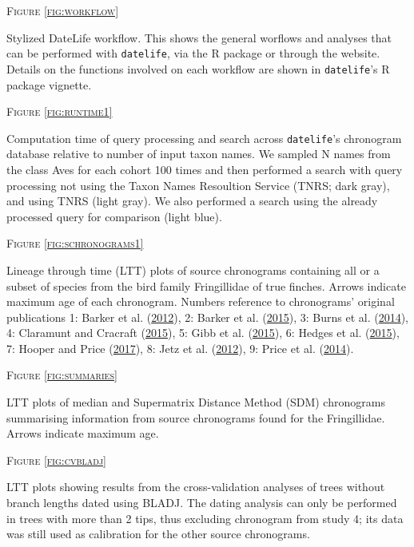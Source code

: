 \documentclass[]{article}
\begin{document}
\begin{center}
\textsc{Figure \ref{fig:workflow}}
\end{center}
Stylized DateLife workflow. This shows the general worflows and analyses that can be performed with \texttt{datelife}, via the R package or through the website. Details on the functions involved on each workflow are shown in \texttt{datelife}'s R package vignette.

\begin{center}
\textsc{Figure \ref{fig:runtime1}}
\end{center}
Computation time of query processing and search across \texttt{datelife}'s chronogram database relative to number of input taxon names. We sampled N names from the class Aves for each cohort 100 times and then performed a search with query processing not using the Taxon Names Resoultion Service (TNRS; dark gray), and using TNRS (light gray). We also performed a search using the already processed query for comparison (light blue). 

\begin{center}
\textsc{Figure \ref{fig:schronograms1}}
\end{center}
Lineage through time (LTT) plots of source chronograms containing all or a subset of species from the bird family Fringillidae of true finches. Arrows indicate maximum age of each chronogram. Numbers reference to chronograms' original publications 1: Barker et al. (\protect\hyperlink{ref-barker2012going}{2012}), 2: Barker et al. (\protect\hyperlink{ref-barker2015new}{2015}), 3: Burns et al. (\protect\hyperlink{ref-burns2014phylogenetics}{2014}), 4: Claramunt and Cracraft (\protect\hyperlink{ref-claramunt2015new}{2015}), 5: Gibb et al. (\protect\hyperlink{ref-gibb2015new}{2015}), 6: Hedges et al. (\protect\hyperlink{ref-Hedges2015}{2015}), 7: Hooper and Price (\protect\hyperlink{ref-hooper2017chromosomal}{2017}), 8: Jetz et al. (\protect\hyperlink{ref-Jetz2012}{2012}), 9: Price et al. (\protect\hyperlink{ref-price2014niche}{2014}).

\begin{center}
\textsc{Figure \ref{fig:summaries}}
\end{center}
LTT plots of median and Supermatrix Distance Method (SDM) chronograms summarising information from source chronograms found for the Fringillidae. Arrows indicate maximum age.

\begin{center}
\textsc{Figure \ref{fig:cvbladj}}
\end{center}
LTT plots showing results from the cross-validation analyses of trees without branch lengths dated using BLADJ. The dating analysis can only be performed in trees with more than 2 tips, thus excluding chronogram from study 4; its data was still used as calibration for the other source chronograms.
\end{document}
